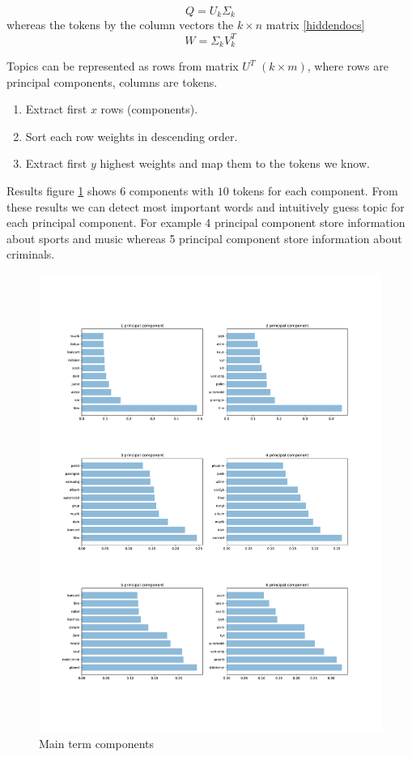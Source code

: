 \documentclass{article}
\begin{document}
\begin{equation}
\label{hiddenterms}
Q = U_k\Sigma_k
\end{equation}
whereas the tokens by the column vectors the $k \times n$ matrix \ref{hiddendocs}
 \begin{equation}
\label{hiddendocs}
W =\Sigma_kV_k^T
\end{equation}

Topics can be represented as rows from matrix $U^T$ $(k \times m)$, where rows are principal components, columns are tokens. 
\begin{enumerate}
\item Extract first $x$ rows (components).
\item Sort each row weights in descending order.
\item Extract first $y$ highest weights and map them to the tokens we know.
\end{enumerate}


 Results figure \ref{main_terms_components} shows $6$ components with $10$ tokens for each component. From these results we can detect most important words and intuitively guess topic for each principal component. For example 4 principal component store information about  sports and music whereas 5 principal component store information about criminals.


\begin{figure}[H]
  \centering
  \includegraphics[scale=0.4]{images/main_term_components.pdf}
  \caption{Main term components}
  \label{main_terms_components}
\end{figure}
\end{document}
